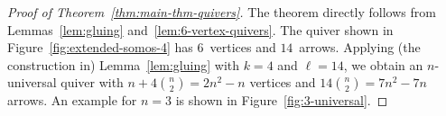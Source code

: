 \begin{proof}[Proof of Theorem~\ref{thm:main-thm-quivers}]
The theorem directly follows from Lemmas~\ref{lem:gluing} and~\ref{lem:6-vertex-quivers}. 
The quiver shown in Figure~\ref{fig:extended-somos-4} has $6$~vertices and $14$~arrows. Applying (the construction in) Lemma~\ref{lem:gluing} with $k=4$ and $\ell=14$, we obtain an $n$-universal quiver with $n+4\binom{n}{2}=2n^2-n$ vertices and $14\binom{n}{2}=7n^2-7n$ arrows. 
An example for $n=3$ is shown in Figure~\ref{fig:3-universal}. 
\end{proof}
